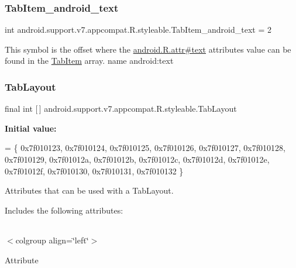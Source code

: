 \subsubsection{\texorpdfstring{Tab\+Item\+\_\+android\+\_\+text}{TabItem\_android\_text}}
{\footnotesize\ttfamily int android.\+support.\+v7.\+appcompat.\+R.\+styleable.\+Tab\+Item\+\_\+android\+\_\+text = 2\hspace{0.3cm}{\ttfamily [static]}}

This symbol is the offset where the \hyperlink{}{android.\+R.\+attr\#text} attribute\textquotesingle{}s value can be found in the \hyperlink{classandroid_1_1support_1_1v7_1_1appcompat_1_1R_1_1styleable_a78bd85485eab436a2e9ff45b047ab398}{Tab\+Item} array.  name android\+:text \mbox{\label{classandroid_1_1support_1_1v7_1_1appcompat_1_1R_1_1styleable_a3c85d0c4cebbccf5b1a16ecfe13938ca}} 
\subsubsection{\texorpdfstring{Tab\+Layout}{TabLayout}}
{\footnotesize\ttfamily final int \mbox{[}$\,$\mbox{]} android.\+support.\+v7.\+appcompat.\+R.\+styleable.\+Tab\+Layout\hspace{0.3cm}{\ttfamily [static]}}

{\bfseries Initial value\+:}
\begin{DoxyCode}
= \{
            0x7f010123, 0x7f010124, 0x7f010125, 0x7f010126,
            0x7f010127, 0x7f010128, 0x7f010129, 0x7f01012a,
            0x7f01012b, 0x7f01012c, 0x7f01012d, 0x7f01012e,
            0x7f01012f, 0x7f010130, 0x7f010131, 0x7f010132
        \}
\end{DoxyCode}
Attributes that can be used with a Tab\+Layout. 

Includes the following attributes\+:

\tabulinesep=1mm
\begin{longtabu} spread 0pt [c]{*{0}{|X[-1]}|}
\hline
\end{longtabu}
$<$colgroup align=\char`\"{}left\char`\"{}$>$ 

Attribute

